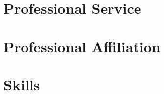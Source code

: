 \documentclass[11pt]{article} %
\begin{document}
\section*{Professional Service}
\label{service}


\section*{Professional Affiliation}
\label{affiliation}



\section*{Skills}
\label{tools}









\end{document}
